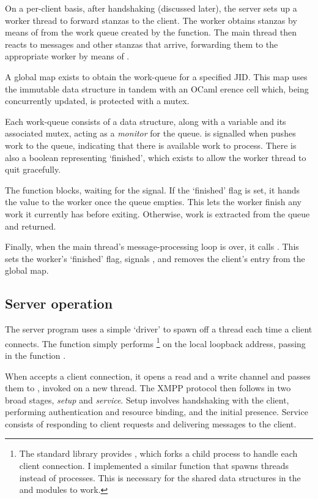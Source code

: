 \documentclass[12pt,a4paper,twoside,openright]{report}
\begin{document}
{On a per-client basis, after handshaking (discussed later), the server sets up a worker thread to forward stanzas to the client. The worker obtains stanzas by means of  from the work queue created by the  function. The main thread then reacts to messages and other stanzas that arrive, forwarding them to the appropriate worker by means of .

A global map exists to obtain the work-queue for a specified JID. This map uses the immutable  data structure in tandem with an OCaml erence cell which, being concurrently updated, is protected with a mutex.

Each work-queue consists of a  data structure, along with a  variable  and its associated mutex, acting as a \emph{monitor} for the queue.  is signalled when  pushes work to the queue, indicating that there is available work to process. There is also a boolean representing `finished', which exists to allow the worker thread to quit gracefully.

The  function blocks, waiting for the  signal. If the `finished' flag is set, it hands the value  to the worker once the queue empties. This lets the worker finish any work it currently has before exiting. Otherwise, work is extracted from the queue and returned.

Finally, when the main thread's message-processing loop is over, it calls . This sets the worker's `finished' flag, signals , and removes the client's entry from the global map.

\subsection{Server operation}
The server program uses a simple `driver' to spawn off a thread each time a client connects. The function  simply performs \footnote{The standard library provides , which forks a child process to handle each client connection. I implemented a similar function that spawns threads instead of processes. This is necessary for the shared data structures in the  and  modules to work.} on the local loopback address, passing in the function .

When  accepts a client connection, it opens a read and a write channel and passes them to , invoked on a new thread. The XMPP protocol then follows in two broad stages, \emph{setup} and \emph{service}. Setup involves handshaking with the client, performing authentication and resource binding, and the initial presence. Service consists of responding to client requests and delivering messages to the client.

}
\end{document}
